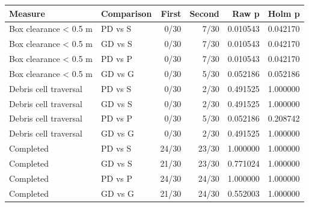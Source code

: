 \begin{tabular}{llrrrr}
\hline
Measure & Comparison & First & Second & Raw p & Holm p \\
\hline
Box clearance \textless{} 0.5 m & PD vs S & 0/30 & 7/30 & 0.010543 & 0.042170 \\
Box clearance \textless{} 0.5 m & GD vs S & 0/30 & 7/30 & 0.010543 & 0.042170 \\
Box clearance \textless{} 0.5 m & PD vs P & 0/30 & 7/30 & 0.010543 & 0.042170 \\
Box clearance \textless{} 0.5 m & GD vs G & 0/30 & 5/30 & 0.052186 & 0.052186 \\
Debris cell traversal & PD vs S & 0/30 & 2/30 & 0.491525 & 1.000000 \\
Debris cell traversal & GD vs S & 0/30 & 2/30 & 0.491525 & 1.000000 \\
Debris cell traversal & PD vs P & 0/30 & 5/30 & 0.052186 & 0.208742 \\
Debris cell traversal & GD vs G & 0/30 & 2/30 & 0.491525 & 1.000000 \\
Completed & PD vs S & 24/30 & 23/30 & 1.000000 & 1.000000 \\
Completed & GD vs S & 21/30 & 23/30 & 0.771024 & 1.000000 \\
Completed & PD vs P & 24/30 & 24/30 & 1.000000 & 1.000000 \\
Completed & GD vs G & 21/30 & 24/30 & 0.552003 & 1.000000 \\
\hline
\end{tabular}
